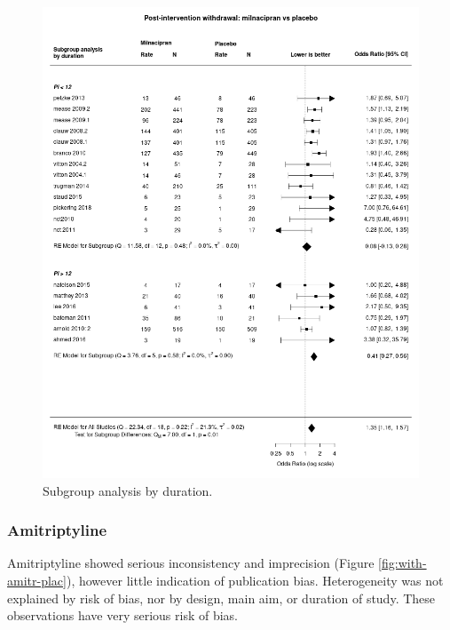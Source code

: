 \documentclass{report}\usepackage[]{graphicx}\usepackage[]{color}
\begin{document}
\begin{figure}
\includegraphics[width=\textwidth]{img/withdrawal-duration-milnacipran-placebo-forest.png}
\caption[Withdrawal duration: milnacipran]{
Subgroup analysis by duration.
}
\label{fig:withdrawal-duration-milna-plac}
\end{figure}

\subsubsection{Amitriptyline}

Amitriptyline showed serious inconsistency and imprecision (Figure \ref{fig:with-amitr-plac}), however little indication of publication bias. Heterogeneity was not explained by risk of bias, nor by design, main aim, or duration of study. These observations have very serious risk of bias.
\end{document}

